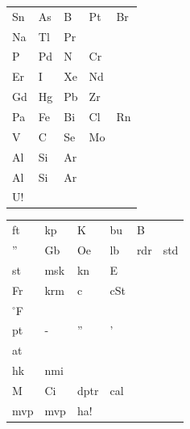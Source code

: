 \documentclass[a6paper,10pt]{article}
\begin{document}
\begin{center}
\end{center}
\vspace{-10pt}
\begin{lyrics}
\begin{table}[!h]
\begin{tabularx}{0.8\textwidth}{X X X X X}
 Sn&As&B&Pt&Br
\vspace{2pt} \\
 Na & Tl & Pr 
\vspace{2pt} \\
  P & Pd & N & Cr
\vspace{2pt} \\
Er & I & Xe & Nd
\vspace{2pt} \\
Gd&Hg&Pb&Zr
\vspace{2pt} \\
Pa&Fe&Bi&Cl&Rn
\vspace{2pt} \\
V&C&Se&Mo
\vspace{2pt} \\
Al &Si&Ar
\vspace{2pt} \\
Al &Si&Ar
\vspace{2pt} \\
U!
\end{tabularx}
\end{table}
\end{lyrics}
\vspace{-10pt}
\begin{center}
\end{center}
\vspace{-10pt}
\begin{lyrics}
\begin{table}[!h]
\begin{tabularx}{0.8\textwidth}{X X X X X X}
 ft&kp&K&bu&B
\vspace{2pt} \\
 '' &Gb & Oe & lb&rdr&std 
\vspace{2pt} \\
st&msk&kn&E
\vspace{2pt} \\
Fr&krm&c&cSt
\vspace{2pt} \\
$^{\circ}$F
\vspace{2pt} \\
pt&-&''&'
\vspace{2pt} \\
at
\vspace{2pt} \\
hk&nmi \\
M&Ci&dptr&cal
\vspace{2pt} \\
mvp & mvp & ha!
\end{tabularx}
\end{table}
\end{lyrics}
\vspace{-10pt}
\end{document}
